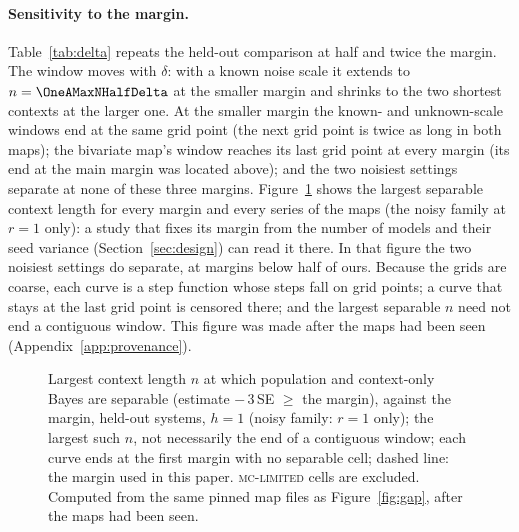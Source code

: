 \paragraph{Sensitivity to the margin.} Table~\ref{tab:delta} repeats the held-out comparison at half and twice the
margin. The window moves with $\delta$: with a known noise scale it extends to $n=\OneAMaxNHalfDelta$ at the smaller margin
and shrinks to the two shortest contexts at the larger one. At the smaller margin the known- and unknown-scale windows end at
the same grid point (the next grid point is twice as long in both maps); the bivariate map's window reaches its last grid
point at every margin (its end at the main margin was located above); and the two noisiest settings separate at none of
these three margins. Figure~\ref{fig:delta} shows the largest separable context length for every margin and every series of
the maps (the noisy family at $r=1$ only): a study that fixes its margin from the number of models and their seed variance
(Section~\ref{sec:design}) can read it there. In that figure the two noisiest settings do separate, at margins below
half of ours. Because the grids are coarse, each curve is a step function whose steps fall on grid points; a curve that stays at
the last grid point is censored there; and the largest separable $n$ need not end a contiguous window. This figure was made after the maps had been seen (Appendix~\ref{app:provenance}).

\begin{figure}[t]
\centering

\caption{Largest context length $n$ at which population and context-only Bayes are separable (estimate $-\,3\,$SE $\ge$ the
margin), against the margin, held-out systems, $h=1$ (noisy family: $r=1$ only); the largest such $n$, not necessarily the
end of a contiguous window; each curve ends at the first margin with no separable cell; dashed
line: the margin used in this paper. \textsc{mc-limited} cells are excluded. Computed from the same pinned map files as
Figure~\ref{fig:gap}, after the maps had been seen.}
\label{fig:delta}
\end{figure}

\begin{table}[t]
\centering\small

\caption{Largest separable context length $n$ ($r=1$, $h=1$, held-out) at three margins; ``--'': none; $^*$: last grid point.
Same files and three-standard-error rule as Table~\ref{tab:maps}.}
\label{tab:delta}
\end{table}

